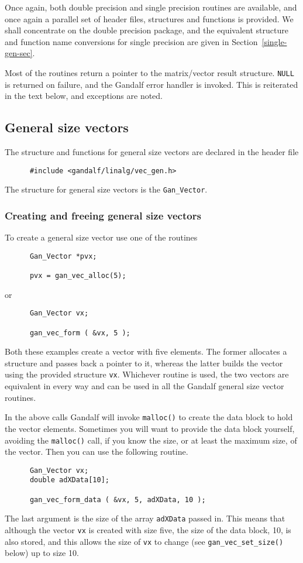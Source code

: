 Once again, both double precision and single precision routines are available,
and once again a parallel set of header files, structures and functions is
provided. We shall concentrate on the double precision package, and the
equivalent structure and function name conversions for single precision are
given in Section~\ref{single-gen-sec}.

Most of the routines return a pointer to the matrix/vector result structure.
{\tt NULL} is returned on failure, and the Gandalf error handler is invoked.
This is reiterated in the text below, and exceptions are noted.

\subsection{General size vectors} \label{general-size-vec-sec}
The structure and functions for general size vectors are declared in the
header file
\begin{verbatim}
      #include <gandalf/linalg/vec_gen.h>
\end{verbatim}
The structure for general size vectors is the {\tt Gan\_Vector}.

\subsubsection{Creating and freeing general size vectors}
To create a general size vector use one of the routines
\begin{verbatim}
      Gan_Vector *pvx;

      pvx = gan_vec_alloc(5);
\end{verbatim}
or
\begin{verbatim}
      Gan_Vector vx;

      gan_vec_form ( &vx, 5 );
\end{verbatim}
Both these examples create a vector with five elements. The former allocates
a structure and passes back a pointer to it, whereas the latter builds the
vector using the provided structure {\tt vx}. Whichever routine is used,
the two vectors are equivalent in every way and can be used in all the
Gandalf general size vector routines.

In the above calls Gandalf will invoke {\tt malloc()} to create the data
block to hold the vector elements. Sometimes you will want to provide the
data block yourself, avoiding the {\tt malloc()} call, if you know the size,
or at least the maximum size, of the vector. Then you can use the
following routine.
\begin{verbatim}
      Gan_Vector vx;
      double adXData[10];

      gan_vec_form_data ( &vx, 5, adXData, 10 );
\end{verbatim}
The last argument is the size of the array {\tt adXData} passed in.
This means that although the vector {\tt vx} is created with size five,
the size of the data block, 10, is also stored, and this allows the
size of {\tt vx} to change (see {\tt gan\_vec\_set\_size()} below) up to
size 10.

